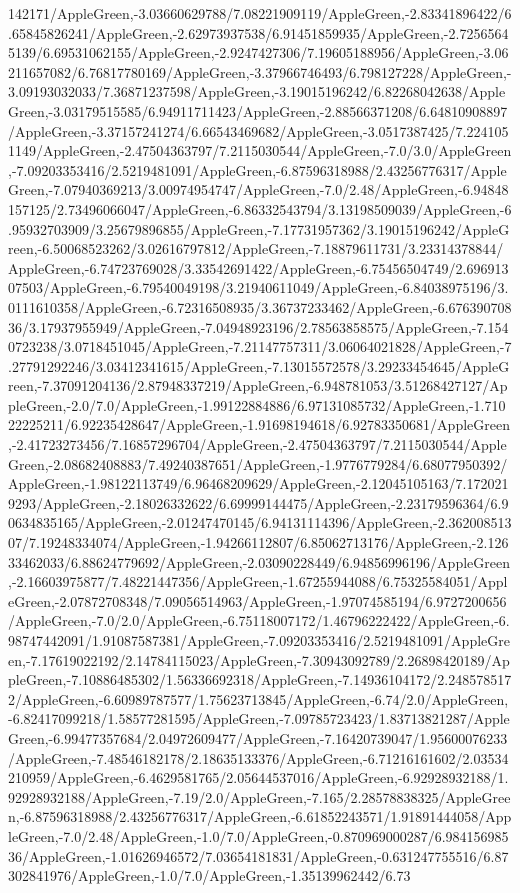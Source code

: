 {\begin{tikzternal}
142171/AppleGreen,-3.03660629788/7.08221909119/AppleGreen,-2.83341896422/6.65845826241/AppleGreen,-2.62973937538/6.91451859935/AppleGreen,-2.72565645139/6.69531062155/AppleGreen,-2.9247427306/7.19605188956/AppleGreen,-3.06211657082/6.76817780169/AppleGreen,-3.37966746493/6.798127228/AppleGreen,-3.09193032033/7.36871237598/AppleGreen,-3.19015196242/6.82268042638/AppleGreen,-3.03179515585/6.94911711423/AppleGreen,-2.88566371208/6.64810908897/AppleGreen,-3.37157241274/6.66543469682/AppleGreen,-3.0517387425/7.2241051149/AppleGreen,-2.47504363797/7.2115030544/AppleGreen,-7.0/3.0/AppleGreen,-7.09203353416/2.5219481091/AppleGreen,-6.87596318988/2.43256776317/AppleGreen,-7.07940369213/3.00974954747/AppleGreen,-7.0/2.48/AppleGreen,-6.94848157125/2.73496066047/AppleGreen,-6.86332543794/3.13198509039/AppleGreen,-6.95932703909/3.25679896855/AppleGreen,-7.17731957362/3.19015196242/AppleGreen,-6.50068523262/3.02616797812/AppleGreen,-7.18879611731/3.23314378844/AppleGreen,-6.74723769028/3.33542691422/AppleGreen,-6.75456504749/2.69691307503/AppleGreen,-6.79540049198/3.21940611049/AppleGreen,-6.84038975196/3.0111610358/AppleGreen,-6.72316508935/3.36737233462/AppleGreen,-6.67639070836/3.17937955949/AppleGreen,-7.04948923196/2.78563858575/AppleGreen,-7.1540723238/3.0718451045/AppleGreen,-7.21147757311/3.06064021828/AppleGreen,-7.27791292246/3.03412341615/AppleGreen,-7.13015572578/3.29233454645/AppleGreen,-7.37091204136/2.87948337219/AppleGreen,-6.948781053/3.51268427127/AppleGreen,-2.0/7.0/AppleGreen,-1.99122884886/6.97131085732/AppleGreen,-1.71022225211/6.92235428647/AppleGreen,-1.91698194618/6.92783350681/AppleGreen,-2.41723273456/7.16857296704/AppleGreen,-2.47504363797/7.2115030544/AppleGreen,-2.08682408883/7.49240387651/AppleGreen,-1.9776779284/6.68077950392/AppleGreen,-1.98122113749/6.96468209629/AppleGreen,-2.12045105163/7.1720219293/AppleGreen,-2.18026332622/6.69999144475/AppleGreen,-2.23179596364/6.90634835165/AppleGreen,-2.01247470145/6.94131114396/AppleGreen,-2.36200851307/7.19248334074/AppleGreen,-1.94266112807/6.85062713176/AppleGreen,-2.12633462033/6.88624779692/AppleGreen,-2.03090228449/6.94856996196/AppleGreen,-2.16603975877/7.48221447356/AppleGreen,-1.67255944088/6.75325584051/AppleGreen,-2.07872708348/7.09056514963/AppleGreen,-1.97074585194/6.9727200656/AppleGreen,-7.0/2.0/AppleGreen,-6.75118007172/1.46796222422/AppleGreen,-6.98747442091/1.91087587381/AppleGreen,-7.09203353416/2.5219481091/AppleGreen,-7.17619022192/2.14784115023/AppleGreen,-7.30943092789/2.26898420189/AppleGreen,-7.10886485302/1.56336692318/AppleGreen,-7.14936104172/2.2485785172/AppleGreen,-6.60989787577/1.75623713845/AppleGreen,-6.74/2.0/AppleGreen,-6.82417099218/1.58577281595/AppleGreen,-7.09785723423/1.83713821287/AppleGreen,-6.99477357684/2.04972609477/AppleGreen,-7.16420739047/1.95600076233/AppleGreen,-7.48546182178/2.18635133376/AppleGreen,-6.71216161602/2.03534210959/AppleGreen,-6.4629581765/2.05644537016/AppleGreen,-6.92928932188/1.92928932188/AppleGreen,-7.19/2.0/AppleGreen,-7.165/2.28578838325/AppleGreen,-6.87596318988/2.43256776317/AppleGreen,-6.61852243571/1.91891444058/AppleGreen,-7.0/2.48/AppleGreen,-1.0/7.0/AppleGreen,-0.870969000287/6.98415698536/AppleGreen,-1.01626946572/7.03654181831/AppleGreen,-0.631247755516/6.87302841976/AppleGreen,-1.0/7.0/AppleGreen,-1.35139962442/6.73
\end{tikzternal}}
